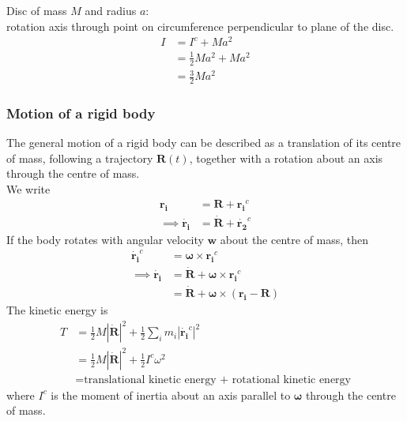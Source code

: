 \documentclass[a4paper]{article}
\begin{document}
\begin{eg}
Disc of mass $M$ and radius $a$:\\
rotation axis through point on circumference perpendicular to plane of the disc.
\begin{equation*}
\begin{aligned}
I&=I^c + Ma^2\\
&=\frac{1}{2}Ma^2 + Ma^2\\
&=\frac{3}{2}Ma^2
\end{aligned}
\end{equation*}
\end{eg}

\subsubsection{Motion of a rigid body}
The general motion of a rigid body can be described as a translation of its centre of mass, following a trajectory $\mathbf{R}\left(t\right)$, together with a rotation about an axis through the centre of mass.\\
We write
\begin{equation*}
\begin{aligned}
\mathbf{r_i} &= \mathbf{R}+\mathbf{r_i}^c\\
\implies \mathbf{\dot{r_i}} &= \mathbf{\dot{R}}+\mathbf{\dot{r_2}}^c
\end{aligned}
\end{equation*}
If the body rotates with angular velocity $\mathbf{w}$ about the centre of mass, then
\begin{equation*}
\begin{aligned}
\mathbf{\dot{r_i}}^c &= \mathbf{\omega} \times \mathbf{r_i}^c\\
\implies \mathbf{\dot{r_i}} &= \mathbf{\dot{R}} + \mathbf{\omega} \times\mathbf{r_i}^c\\
&=\mathbf{\dot{R}}+\mathbf{\omega}\times\left(\mathbf{r_i}-\mathbf{R}\right)
\end{aligned}
\end{equation*}
The kinetic energy is
\begin{equation*}
\begin{aligned}
T &= \frac{1}{2} M|\mathbf{\dot{R}}|^2 + \frac{1}{2}\sum_i m_i |\mathbf{\dot{r_i}}^c|^2\\
&= \frac{1}{2} M|\mathbf{\dot{R}}|^2 + \frac{1}{2}I^c \omega^2\\
&=\text{translational kinetic energy + rotational kinetic energy}
\end{aligned}
\end{equation*}
where $I^c$ is the moment of inertia about an axis parallel to $\mathbf{\omega}$ through the centre of mass.\\
\end{document}
